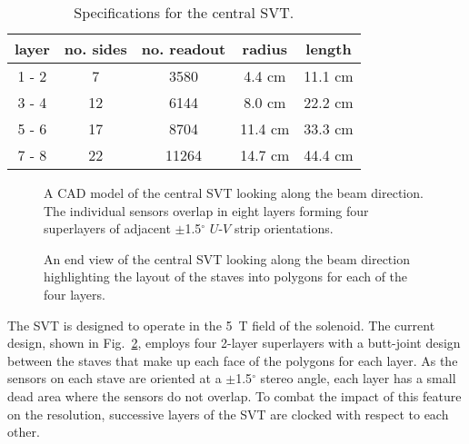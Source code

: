 \begin{table}[htbp]
\begin{center}
\begin{tabular} {||c|c|c|c|c||} \hline \hline
{\bf layer} & {\bf no. sides} & {\bf no. readout} & {\bf radius} & {\bf length}\\ \hline
1 - 2 & 7 & 3580 & 4.4 cm & 11.1 cm    \\ \hline
3 - 4 & 12 & 6144 & 8.0 cm & 22.2 cm    \\ \hline
5 - 6 & 17 & 8704 & 11.4 cm & 33.3 cm    \\ \hline
7 - 8 & 22 & 11264 & 14.7 cm & 44.4 cm    \\ \hline
\end{tabular}
\caption{\small{Specifications for the central SVT.}}
\label{central-silicon-specs}
\end{center}
\end{table}

\begin{figure}[htbp]
\vspace{7.0cm}
\caption{\small{A CAD model of the central SVT looking along the beam
direction.  The individual sensors overlap in eight layers forming four
superlayers of adjacent $\pm$1.5$^{\circ}$ $U$-$V$ strip orientations.}}
\label{centralsvt1}
\end{figure}

\begin{figure}[htbp]
\vspace{7.5cm}
\caption{\small{An end view of the central SVT looking along the beam
direction highlighting the layout of the staves into polygons for each
of the four layers.}}
\label{centralsvt2}
\end{figure}

The SVT is designed to operate in the 5~T field of the solenoid.  The
current design, shown in Fig.~\ref{centralsvt2}, employs four 2-layer
superlayers with a butt-joint design between the staves that make up
each face of the polygons for each layer.  As the sensors on each stave
are oriented at a $\pm$1.5$^{\circ}$ stereo angle, each layer has a
small dead area where the sensors do not overlap.  To combat the impact
of this feature on the resolution, successive layers of the SVT are
clocked with respect to each other.

